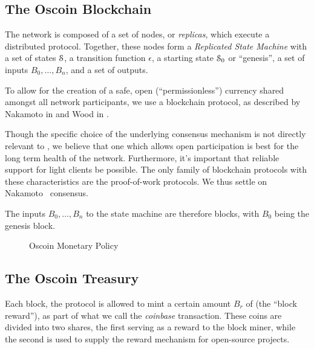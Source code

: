 \subsection{The Oscoin Blockchain}


The \oscoin{} network is composed of a set of nodes, or \emph{replicas}, which
execute a distributed protocol. Together, these nodes form a \emph{Replicated
  State Machine} with a set of states $\mathcal{S}$, a transition function $\epsilon$,
a starting state $\mathcal{S}_0$ or ``genesis'', a set of inputs $B_0, \ldots, B_n$,
and a set of outputs.

To allow for the creation of a safe, open (``permissionless'') currency shared
amongst all network participants, we use a blockchain protocol, as described by
Nakamoto in \cite{bitcoin} and Wood in \cite{ethereum}.

Though the specific choice of the underlying consensus mechanism is not
directly relevant to \oscoin{}, we believe that one which allows open
participation is best for the long term health of the network. Furthermore,
it's important that reliable support for light clients be possible. The only
family of blockchain protocols with these characteristics are the proof-of-work
protocols. We thus settle on Nakamoto~\cite{bitcoin} consensus.

The inputs $B_0, \ldots, B_n$ to the state machine are therefore blocks, with
$B_0$ being the genesis block.


\begin{figure*}[!ht]
    \par\medskip\noindent\minipage{\linewidth}
    \centering
    
    \caption{Oscoin Monetary Policy\label{f:oscoin}}
    \endminipage\par\medskip
\end{figure*}

\subsection{The Oscoin Treasury}

Each block, the protocol is allowed to mint a certain amount $B_r$ of \oscoin{}
(the ``block reward''), as part of what we call the \emph{coinbase}
transaction. These coins are divided into two shares, the first serving as a
reward to the block miner, while the second is used to supply the reward
mechanism for open-source projects.

